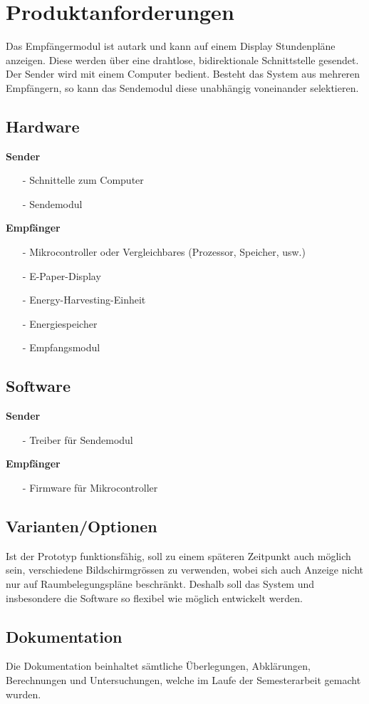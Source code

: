 \section{Produktanforderungen}
\label{sec:funcReqs}
Das Empfängermodul ist autark und kann auf einem Display Stundenpläne anzeigen.
Diese werden über eine drahtlose, bidirektionale Schnittstelle gesendet.
Der Sender wird mit einem Computer bedient.
Besteht das System aus mehreren Empfängern, so kann das Sendemodul diese unabhängig voneinander selektieren.

\subsection{Hardware}
\textbf{Sender}
	\begin{itemize}
		\item[-] Schnittelle zum Computer
		\item[-] Sendemodul
	\end{itemize}

\textbf{Empfänger}
	\begin{itemize}
		\item[-] Mikrocontroller oder Vergleichbares (Prozessor, Speicher, usw.)
		\item[-] E-Paper-Display
		\item[-] Energy-Harvesting-Einheit
		\item[-] Energiespeicher
		\item[-] Empfangsmodul
	\end{itemize}

\subsection{Software}
\textbf{Sender}
\begin{itemize}
	\item[-] Treiber für Sendemodul
\end{itemize}

\textbf{Empfänger}
\begin{itemize}
	\item[-] Firmware für Mikrocontroller
\end{itemize}

\subsection{Varianten/Optionen}
Ist der Prototyp funktionsfähig, soll zu einem späteren Zeitpunkt auch möglich sein, verschiedene Bildschirmgrössen zu verwenden, wobei sich auch Anzeige nicht nur auf Raumbelegungspläne beschränkt.
Deshalb soll das System und insbesondere die Software so flexibel wie möglich entwickelt werden.

\subsection{Dokumentation}
Die Dokumentation beinhaltet sämtliche Überlegungen, Abklärungen, Berechnungen und Untersuchungen, welche im Laufe der Semesterarbeit gemacht wurden.